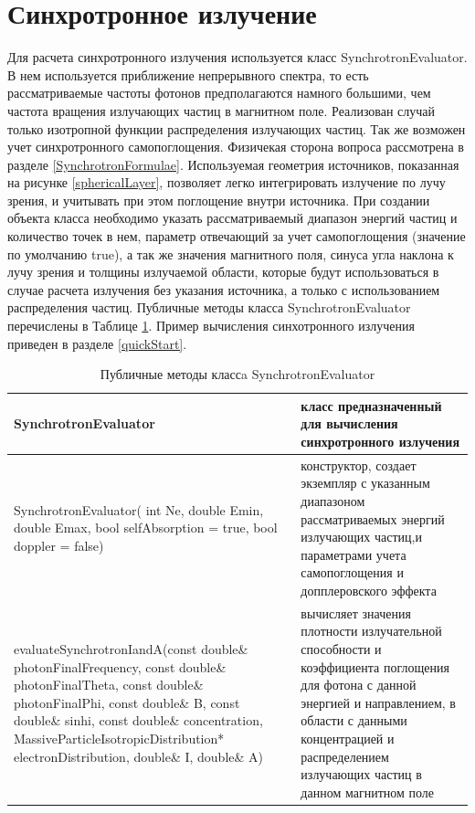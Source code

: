 \section{Синхротронное излучение}
Для расчета синхротронного излучения используется класс SynchrotronEvaluator. В нем используется приближение непрерывного спектра, то есть рассматриваемые частоты фотонов предполагаются намного большими, чем частота вращения излучающих частиц в магнитном поле. Реализован случай только изотропной функции распределения излучающих частиц. Так же возможен учет синхротронного самопоглощения. Физичекая сторона вопроса рассмотрена в разделе \ref{SynchrotronFormulae}. Используемая геометрия источников, показанная на рисунке \ref{sphericalLayer}, позволяет легко интегрировать излучение по лучу зрения, и учитывать при этом поглощение внутри источника. При создании объекта класса необходимо указать рассматриваемый диапазон энергий частиц и количество точек в нем, параметр отвечающий за учет самопоглощения (значение по умолчанию true), а так же значения магнитного поля, синуса угла наклона к лучу зрения и толщины излучаемой области, которые будут использоваться в случае расчета излучения без указания источника, а только с использованием распределения частиц. Публичные методы класса SynchrotronEvaluator перечислены в Таблице \ref{SynchrotronEvaluator}. Пример вычисления синхотронного излучения приведен в разделе \ref{quickStart}.

\begin{table}[h!]
	\begin{center}
	\begin{small}
	\caption{Публичные методы классa SynchrotronEvaluator }
	\label{SynchrotronEvaluator}
	\begin{tabularx}{\textwidth}{|X|X|} 
		\hline
		\textbf{SynchrotronEvaluator} & класс предназначенный для вычисления синхротронного излучения\\
		\hline
		SynchrotronEvaluator( int Ne, double Emin, double Emax, bool selfAbsorption = true, bool doppler = false) & конструктор, создает экземпляр с указанным диапазоном рассматриваемых энергий излучающих частиц,и параметрами учета самопоглощения и допплеровского эффекта\\
		\hline
		evaluateSynchrotronIandA(const double\& photonFinalFrequency, const double\& photonFinalTheta, const double\& photonFinalPhi, const double\& B, const double\& sinhi, const double\& concentration, MassiveParticleIsotropicDistribution* electronDistribution, double\& I, double\& A) & вычисляет значения плотности излучательной способности и коэффициента поглощения для фотона с данной энергией и направлением, в области с данными концентрацией и распределением излучающих частиц в данном магнитном поле\\
		\hline
	\end{tabularx}
\end{small}
\end{center}
\end{table}


